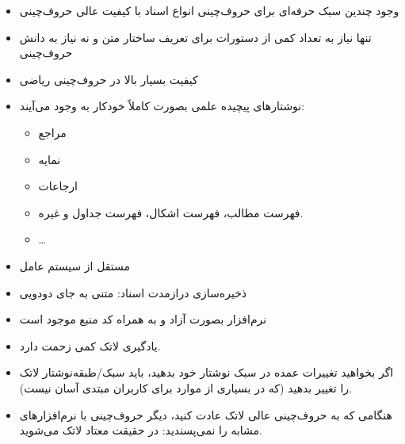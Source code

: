 \begin{plainslide}
\begin{itemize}
\item
وجود چندین سبک حرفه‌ای برای حروف‌چینی انواع اسناد با کیفیت عالی حروف‌چینی 
\item
تنها نیاز به  تعداد کمی از دستورات برای تعریف ساختار متن  و نه نیاز به دانش  حروف‌چینی 
\item
کیفیت بسیار بالا در حروف‌چینی ریاضی

\item
نوشتارهای پیچیده علمی بصورت کاملاً خودکار به وجود می‌آیند:
\begin{itemize}
\item
مراجع
\item نمایه

\item ارجاعات

\item 
فهرست مطالب، فهرست اشکال، فهرست جداول و غیره.
\item\ldots
\end{itemize}
\item
مستقل از سیستم عامل 
\item
ذخیره‌سازی درازمدت اسناد: متنی به جای دودویی
\item
نرم‌افزار بصورت آزاد  و به همراه کد منبع موجود است
\end{itemize}
\end{plainslide}
%
\begin{plainslide}
\begin{itemize}
\item
یادگیری لاتک کمی زحمت دارد.
\item
اگر بخواهید تغییرات عمده در سبک نوشتار خود بدهید، باید سبک/طبقه‌نوشتار لاتک را تغییر بدهید (که در بسیاری از موارد برای کاربران مبتدی آسان نیست).
\item
هنگامی که به حروف‌چینی عالی لاتک عادت کنید، دیگر حروف‌چینی با نرم‌افزارهای مشابه را نمی‌پسندید: در حقیقت معتاد لاتک می‌شوید.
\end{itemize}
\end{plainslide}
%
%
